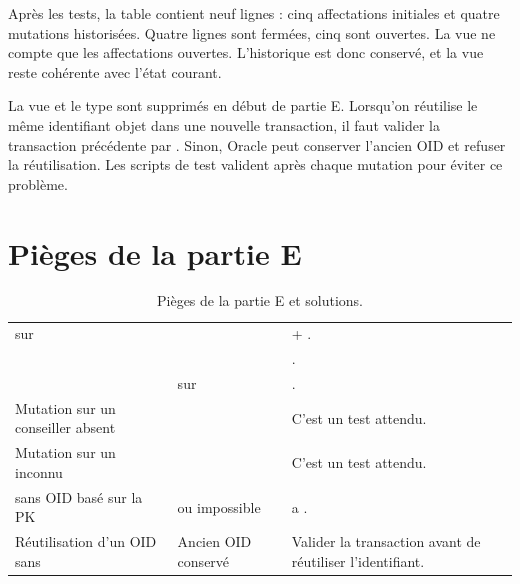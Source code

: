 Après les tests, la table  contient neuf lignes : cinq
affectations initiales et quatre mutations historisées. Quatre lignes sont
fermées, cinq sont ouvertes. La vue ne compte que les affectations ouvertes.
L'historique est donc conservé, et la vue reste cohérente avec l'état courant.

\begin{attentionbox}[Rejouer E12]
La vue et le type  sont supprimés en début de partie E.
Lorsqu'on réutilise le même identifiant objet dans une nouvelle transaction, il
faut valider la transaction précédente par . Sinon, Oracle peut
conserver l'ancien OID et refuser la réutilisation. Les scripts de test valident
après chaque mutation pour éviter ce problème.
\end{attentionbox}

\section{Pièges de la partie E}

\begin{table}[htbp]
  \centering
  \small
  \caption{Pièges de la partie E et solutions.}
  \label{tab:pieges-E}
  \begin{tabularx}{\textwidth}{@{}L{5.1cm}L{4.3cm}X@{}}
    \toprule
     &  &  \\
    \midrule
     sur  &  &
     + . \\
     &
     &
    . \\
     &  sur
     &
    . \\
    Mutation sur un conseiller absent &  &
    C'est un test attendu. \\
    Mutation sur un inconnu &  &
    C'est un test attendu. \\
     sans OID basé sur la PK &
     ou impossible &
     a . \\
    Réutilisation d'un OID sans  &
    Ancien OID conservé &
    Valider la transaction avant de réutiliser l'identifiant. \\
    \bottomrule
  \end{tabularx}
\end{table}

